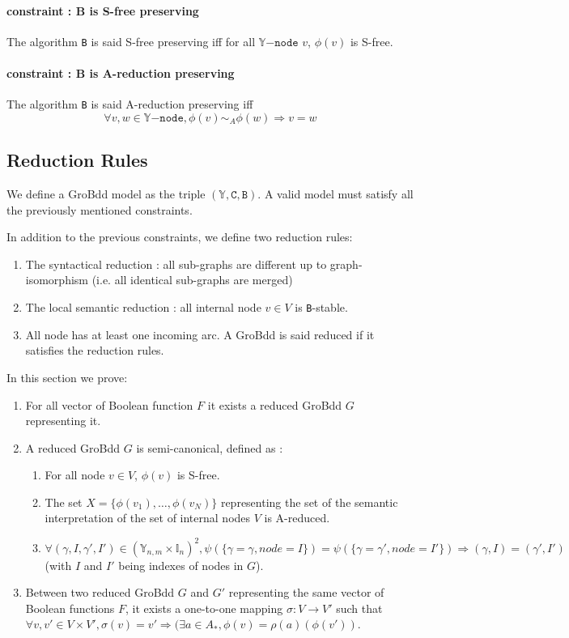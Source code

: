 \documentclass[a4paper,10pt]{article}
\newcommand{\Y}{\mathbb{Y}}%
\newcommand{\I}{\mathbb{I}}%
\newcommand{\Ynode}{\Y\mathtt{-node}}
\begin{document}
\paragraph{constraint : B is S-free preserving\\}
The algorithm \texttt{B} is said S-free preserving iff for all $\Ynode$ $v$, $\phi(v)$ is S-free.

\paragraph{constraint : B is A-reduction preserving\\}
The algorithm \texttt{B} is said A-reduction preserving iff
\[\forall v, w \in\Ynode, \phi(v) \sim_A \phi(w) \Rightarrow v = w\]

\subsection{Reduction Rules}
We define a GroBdd model as the triple $(\Y, \mathtt{C}, \mathtt{B})$.
A valid model must satisfy all the previously mentioned constraints.

In addition to the previous constraints, we define two reduction rules:\begin{enumerate}
\item The syntactical reduction : all sub-graphs are different up to graph-isomorphism (i.e. all identical sub-graphs are merged)
\item The local semantic reduction : all internal node $v\in V$ is \texttt{B}-stable.
\item All node has at least one incoming arc.
A GroBdd is said reduced if it satisfies the reduction rules.
\end{enumerate}
In this section we prove:\begin{enumerate}
\item For all vector of Boolean function $F$ it exists a reduced GroBdd $G$ representing it.
\item A reduced GroBdd $G$ is semi-canonical, defined as :\begin{enumerate}
\item For all node $v\in V$, $\phi(v)$ is S-free.
\item The set $X = \{\phi(v_1), \dots, \phi(v_N)\}$ representing the set of the semantic interpretation of the set of internal nodes $V$ is A-reduced.
\item $\forall (\gamma, I, \gamma', I') \in (\Y_{n, m} \times \I_n)^2, \psi(\{\gamma = \gamma, node = I\}) = \psi(\{\gamma = \gamma', node = I'\}) \Rightarrow (\gamma, I) = (\gamma', I')$ (with $I$ and $I'$ being indexes of nodes in $G$).
\end{enumerate}
\item Between two reduced GroBdd $G$ and $G'$ representing the same vector of Boolean functions $F$, it exists a one-to-one mapping $\sigma : V \longrightarrow V'$ such that $\forall v, v' \in V \times V', \sigma(v) = v' \Rightarrow (\exists a \in A_{*}, \phi(v) = \rho(a)(\phi(v'))$.
\end{enumerate}
\end{document}
